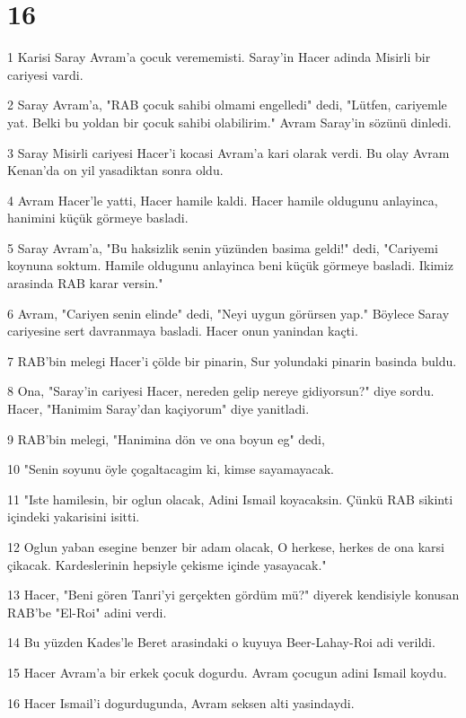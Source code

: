 \chapter{16}

\par 1 Karisi Saray Avram'a çocuk verememisti. Saray'in Hacer adinda Misirli bir cariyesi vardi.
\par 2 Saray Avram'a, "RAB çocuk sahibi olmami engelledi" dedi, "Lütfen, cariyemle yat. Belki bu yoldan bir çocuk sahibi olabilirim." Avram Saray'in sözünü dinledi.
\par 3 Saray Misirli cariyesi Hacer'i kocasi Avram'a kari olarak verdi. Bu olay Avram Kenan'da on yil yasadiktan sonra oldu.
\par 4 Avram Hacer'le yatti, Hacer hamile kaldi. Hacer hamile oldugunu anlayinca, hanimini küçük görmeye basladi.
\par 5 Saray Avram'a, "Bu haksizlik senin yüzünden basima geldi!" dedi, "Cariyemi koynuna soktum. Hamile oldugunu anlayinca beni küçük görmeye basladi. Ikimiz arasinda RAB karar versin."
\par 6 Avram, "Cariyen senin elinde" dedi, "Neyi uygun görürsen yap." Böylece Saray cariyesine sert davranmaya basladi. Hacer onun yanindan kaçti.
\par 7 RAB'bin melegi Hacer'i çölde bir pinarin, Sur yolundaki pinarin basinda buldu.
\par 8 Ona, "Saray'in cariyesi Hacer, nereden gelip nereye gidiyorsun?" diye sordu. Hacer, "Hanimim Saray'dan kaçiyorum" diye yanitladi.
\par 9 RAB'bin melegi, "Hanimina dön ve ona boyun eg" dedi,
\par 10 "Senin soyunu öyle çogaltacagim ki, kimse sayamayacak.
\par 11 "Iste hamilesin, bir oglun olacak, Adini Ismail koyacaksin. Çünkü RAB sikinti içindeki yakarisini isitti.
\par 12 Oglun yaban esegine benzer bir adam olacak, O herkese, herkes de ona karsi çikacak. Kardeslerinin hepsiyle çekisme içinde yasayacak."
\par 13 Hacer, "Beni gören Tanri'yi gerçekten gördüm mü?" diyerek kendisiyle konusan RAB'be "El-Roi" adini verdi.
\par 14 Bu yüzden Kades'le Beret arasindaki o kuyuya Beer-Lahay-Roi adi verildi.
\par 15 Hacer Avram'a bir erkek çocuk dogurdu. Avram çocugun adini Ismail koydu.
\par 16 Hacer Ismail'i dogurdugunda, Avram seksen alti yasindaydi.

